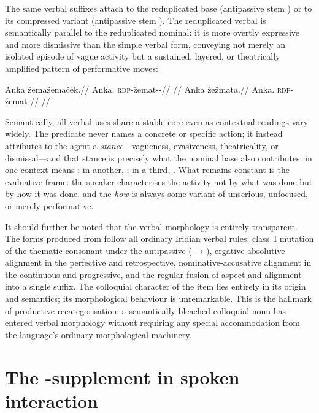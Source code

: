 The same verbal suffixes attach to the reduplicated base 
(antipassive stem ) or to its compressed variant 
(antipassive stem ). The reduplicated verbal is semantically
parallel to the reduplicated nominal: it is more overtly expressive and more
dismissive than the simple verbal form, conveying not merely an isolated episode
of vague activity but a sustained, layered, or theatrically amplified pattern
of performative moves:

\pex
\a
\begingl
\gla Anka žemažemačék.//
\glb Anka.\Dir{} \textsc{rdp}-žemat-\Antip{}-\Pf{}//
\glft {}//
\endgl
\a
\begingl
\gla Anka žežmata.//
\glb Anka.\Dir{} \textsc{rdp}-žemat-\Cont{}//
\glft {}//
\endgl
\xe

Semantically, all verbal uses share a stable core even as contextual readings
vary widely. The predicate never names a concrete or specific action; it instead
attributes to the agent a \emph{stance}---vagueness, evasiveness, theatricality,
or dismissal---and that stance is precisely what the nominal base also
contributes.  in one context means ; in another, ; in a third, . What remains constant is the evaluative frame:
the speaker characterises the activity not by what was done but by how it was
done, and the \textit{how} is always some variant of unserious, unfocused, or
merely performative.

It should further be noted that the verbal morphology is entirely transparent.
The forms produced from  follow all ordinary Iridian verbal rules:
class~I mutation of the thematic consonant under the antipassive
( → ), ergative-absolutive alignment in the perfective and
retrospective, nominative-accusative alignment in the continuous and
progressive, and the regular fusion of aspect and alignment into a single
suffix. The colloquial character of the item lies entirely in its origin and
semantics; its morphological behaviour is unremarkable. This is the hallmark of
productive recategorisation: a semantically bleached colloquial noun has entered
verbal morphology without requiring any special accommodation from the
language's ordinary morphological machinery.

\section{The -supplement in spoken interaction}
\label{sec:spoken-ty}

